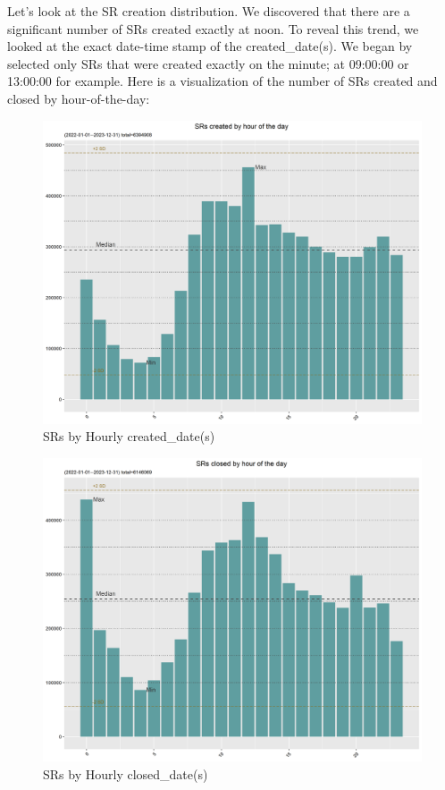 \documentclass[12pt, titlepage]{article}
\begin{document}
	Let's look at the SR creation distribution. We discovered that there are a significant number of SRs created exactly at noon. To reveal this
	trend, we looked at the exact date-time stamp of the created\_date(s). We began by selected only SRs that were created exactly on the minute;
	at 09:00:00 or 13:00:00 for example.  Here is a visualization of the number of SRs created and closed by hour-of-the-day:
	
	\begin{figure}[H]
		 \centering
		 \includegraphics[scale = 0.65]{Created_Hourly_SR_count.png}
		 \caption{SRs by Hourly created\_date(s)}
		 \label{fig:hourly-created}
	\end{figure}	
	
	\begin{figure}[H]
		 \centering
		 \includegraphics[scale = 0.65]{Closed_Hourly_SR_count.png}
		 \caption{SRs by Hourly closed\_date(s)}
		 \label{fig:hourly-closed}
	\end{figure}	
	
\end{document}
